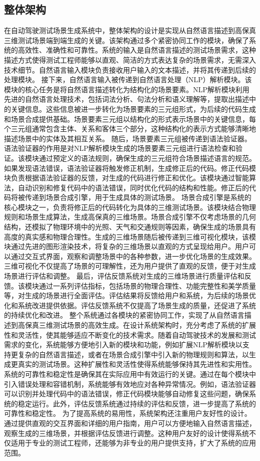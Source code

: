 \documentclass{article}
\begin{document}
\subsection{整体架构}
在自动驾驶测试场景生成系统中，整体架构的设计是实现从自然语言描述到高保真三维测试场景端到端生成的关键。该架构通过多个紧密协同工作的模块，确保了系统的高效性、准确性和可靠性。系统的输入是自然语言描述的测试场景需求，这种描述方式使得测试工程师能够以直观、简洁的方式表达复杂的场景需求，无需深入技术细节。自然语言输入模块负责接收用户输入的文本描述，并将其传递到后续的处理模块。
接下来，自然语言输入被传递到自然语言处理（NLP）解析模块。该模块的核心任务是将自然语言描述转化为结构化的场景要素。NLP解析模块利用先进的自然语言处理技术，包括词法分析、句法分析和语义理解等，提取出描述中的关键信息。这些信息被进一步转化为场景要素的三元组形式，为后续的代码生成和场景合成提供基础。场景要素三元组以结构化的形式表示场景中的关键信息，每个三元组通常包含主体、关系和客体三个部分，这种结构化的表示方式能够清晰地描述场景中的实体及其相互关系。
随后，场景要素三元组被传递到语法验证器。语法验证器的作用是对NLP解析模块生成的场景要素三元组进行语法检查和验证。该模块通过预定义的语法规则，确保生成的三元组符合场景描述语言的规范。如果发现语法错误，语法验证器将触发修正机制，生成修正后的代码。修正代码模块负责根据语法验证器的反馈，对生成的代码进行修正和优化。该模块通过智能算法，自动识别和修复代码中的语法错误，同时优化代码的结构和性能。修正后的代码将被传递到场景合成引擎，用于生成具体的测试场景。
场景合成引擎是系统的核心模块之一，负责将修正后的代码转化为具体的三维测试场景。该模块结合物理规则和场景生成算法，生成高保真的三维场景。场景合成引擎不仅考虑场景的几何结构，还模拟了物理环境中的光照、天气和交通规则等因素，确保生成的场景具有高度的真实感和物理合理性。生成的三维场景随后被传递到三维可视化模块，该模块通过先进的图形渲染技术，将复杂的三维场景以直观的方式呈现给用户。用户可以通过交互式界面，观察和调整场景中的各种参数，进一步优化场景的生成效果。三维可视化不仅提高了场景的可理解性，还为用户提供了直观的反馈，便于对生成场景进行评估和调整。
最后，评估反馈系统对生成的三维场景进行质量评估和反馈。该模块通过一系列评估指标，包括场景的物理合理性、功能完整性和美学质量等，对生成的场景进行全面评估。评估结果将反馈给用户和系统，为后续的场景优化和系统改进提供依据。评估反馈系统不仅提高了场景生成的质量，还促进了系统的持续优化和改进。
整个系统通过各模块的紧密协同工作，实现了从自然语言描述到高保真三维测试场景的高效生成。在设计系统架构时，充分考虑了系统的扩展性和灵活性，使其能够适应不断变化的技术需求。随着自动驾驶技术的发展和测试需求的变化，系统能够方便地引入新的模块和功能，例如扩展NLP解析模块以支持更复杂的自然语言描述，或者在场景合成引擎中引入新的物理规则和算法，以生成更真实的测试场景。这种扩展性和灵活性使得系统能够保持其先进性和实用性。
系统的可靠性和稳定性是确保其在实际应用中有效运行的关键。通过在每个模块中引入错误处理和容错机制，系统能够有效地应对各种异常情况。例如，语法验证器可以识别并处理代码中的语法错误，修正代码模块能够自动修复这些问题，确保系统的稳定运行。此外，评估反馈系统通过持续的评估和反馈，进一步提高了系统的可靠性和稳定性。
为了提高系统的易用性，系统架构还注重用户友好性的设计。通过提供直观的交互界面和详细的用户指南，用户可以方便地输入自然语言描述，观察生成的三维场景，并根据评估反馈进行调整。这种用户友好的设计使得系统不仅适用于专业的测试工程师，还能够为非专业的用户提供支持，扩大了系统的应用范围。
\end{document}
